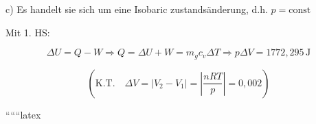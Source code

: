c) Es handelt sie sich um eine Isobaric zustandsänderung, d.h. \( p = \text{const} \)

Mit 1. HS:

\[
\Delta U = Q - W \Rightarrow Q = \Delta U + W = m_g c_v \Delta T \Rightarrow p \Delta V = 1772,295 \, \text{J}
\]

\[
\left( \text{K.T.} \quad \Delta V = |V_2 - V_1| = \left| \frac{nRT}{p} \right| = 0,002 \right)
\]

``````latex